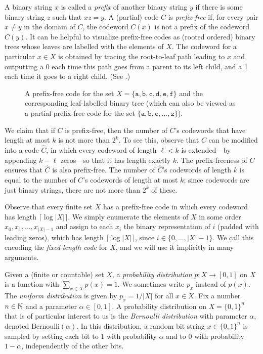 \documentclass{patmorin}
\begin{document}
A binary string
$x$ is called a \emph{prefix} of another binary string $y$ if there
is some binary string $z$ such that $xz = y$. A (partial) code $C$
is \emph{prefix-free} if, for every pair $x\neq y$ in the domain of
$C$, the codeword $C(x)$ is not a prefix of the codeword $C(y)$.  It can be
helpful to visualize prefix-free
codes as (rooted ordered) binary trees whose leaves are labelled with
the elements of $X$.  The codeword for a particular
$x\in X$ is obtained by tracing the root-to-leaf path leading to $x$
and outputting a 0 each time this path goes from a parent to its left
child, and a 1 each time it goes to a right child. (See
.)

\begin{figure}
  \caption{A prefix-free code for the set
    $X=\{\mathtt{a},\mathtt{b},\mathtt{c},\mathtt{d},\mathtt{e},\mathtt{f}\}$
    and the corresponding leaf-labelled binary tree (which can also be
    viewed as a partial prefix-free code for the set
    $\{\mathtt{a},\mathtt{b},\mathtt{c},\ldots,\mathtt{z}\}$).}
\end{figure}

We claim that if $C$ is prefix-free, then the
number of $C$'s codewords that have length at most $k$ is not more
than $2^k$. To see this, observe that $C$ can be
modified into a code $\widehat C$, in which every codeword of length
$\ell <k$ is extended---by appending $k-\ell$ zeros---so that it has
length exactly $k$. The prefix-freeness of $C$ ensures that $\widehat C$
is also prefix-free. The number of $\widehat C$'s codewords of
length $k$ is equal to the number of $C$'s codewords of length at
most $k$; since codewords are just binary strings, there are not more
than $2^k$ of these.

Observe that every finite set $X$ has a prefix-free code in which
every codeword has length $\lceil\log |X|\rceil$. We simply enumerate
the elements of $X$ in some order $x_0,x_1,\ldots,x_{|X|-1}$ and
assign to each $x_i$ the binary representation of $i$ (padded with
leading zeros), which has length $\lceil\log |X|\rceil$, since
$i\in\{0,\ldots,|X|-1\}$.  We call this encoding the \emph{fixed-length
code} for $X$, and we will use it implicitly in many arguments.

Given a (finite or countable) set $X$, a \emph{probability distribution} 
$p: X \rightarrow [0,1]$ on $X$ is a function with
$\sum_{x \in X} p(x) = 1$. We sometimes write $p_x$
instead of $p(x)$. 
The \emph{uniform distribution} is given by $p_x = 1/|X|$ for
all $x \in X$.
Fix a number $n \in \mathbb{N}$ and a
parameter $\alpha \in [0,1]$.
A probability distribution on $X = \{0, 1\}^n$
that is of particular interest to us is the \emph{Bernoulli
distribution} with parameter $\alpha$, denoted 
$\mathrm{Bernoulli}(\alpha)$. In this distribution, a
random bit string $x \in \{0, 1\}^n$ is sampled by setting each bit
to $1$ with probability $\alpha$ and to $0$ with probability $1-\alpha$,
independently of the other bits.
\end{document}

